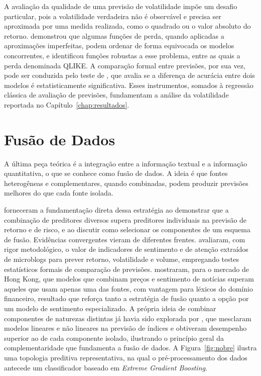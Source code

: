 A avaliação da qualidade de uma previsão de volatilidade impõe um desafio particular, pois a volatilidade verdadeira não é observável e precisa ser aproximada por uma medida realizada, como o quadrado ou o valor absoluto do retorno.  demonstrou que algumas funções de perda, quando aplicadas a aproximações imperfeitas, podem ordenar de forma equivocada os modelos concorrentes, e identificou funções robustas a esse problema, entre as quais a perda denominada QLIKE. A comparação formal entre previsões, por sua vez, pode ser conduzida pelo teste de , que avalia se a diferença de acurácia entre dois modelos é estatisticamente significativa. Esses instrumentos, somados à regressão clássica de avaliação de previsões, fundamentam a análise da volatilidade reportada no Capítulo~\ref{chap:resultados}.

\section{Fusão de Dados}

A última peça teórica é a integração entre a informação textual e a informação quantitativa, o que se conhece como fusão de dados. A ideia é que fontes heterogêneas e complementares, quando combinadas, podem produzir previsões melhores do que cada fonte isolada.

 forneceram a fundamentação direta dessa estratégia ao demonstrar que a combinação de preditores diversos supera preditores individuais na previsão de retorno e de risco, e ao discutir como selecionar os componentes de um esquema de fusão. Evidências convergentes vieram de diferentes frentes.  avaliaram, com rigor metodológico, o valor de indicadores de sentimento e de atenção extraídos de microblogs para prever retorno, volatilidade e volume, empregando testes estatísticos formais de comparação de previsões.  mostraram, para o mercado de Hong Kong, que modelos que combinam preços e sentimento de notícias superam aqueles que usam apenas uma das fontes, com vantagem para léxicos do domínio financeiro, resultado que reforça tanto a estratégia de fusão quanto a opção por um modelo de sentimento especializado. A própria ideia de combinar componentes de naturezas distintas já havia sido explorada por , que mesclaram modelos lineares e não lineares na previsão de índices e obtiveram desempenho superior ao de cada componente isolado, ilustrando o princípio geral da complementaridade que fundamenta a fusão de dados. A Figura~\ref{fig:nobre} ilustra uma topologia preditiva representativa, na qual o pré-processamento dos dados antecede um classificador baseado em \textit{Extreme Gradient Boosting}.

